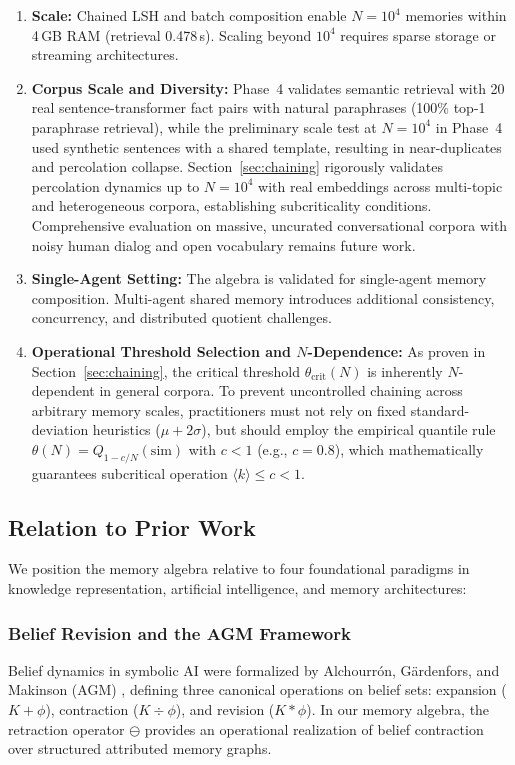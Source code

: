 \documentclass[11pt,a4paper]{article}
\theoremstyle{definition}
\begin{document}
\begin{enumerate}
    \item \textbf{Scale:} Chained LSH and batch composition enable $N = 10^4$ memories within 4\,GB RAM (retrieval 0.478\,s). Scaling beyond $10^4$ requires sparse storage or streaming architectures.
    \item \textbf{Corpus Scale and Diversity:} Phase~4 validates semantic retrieval with 20 real sentence-transformer fact pairs with natural paraphrases (100\% top-1 paraphrase retrieval), while the preliminary scale test at $N = 10^4$ in Phase~4 used synthetic sentences with a shared template, resulting in near-duplicates and percolation collapse. Section~\ref{sec:chaining} rigorously validates percolation dynamics up to $N = 10^4$ with real embeddings across multi-topic and heterogeneous corpora, establishing subcriticality conditions. Comprehensive evaluation on massive, uncurated conversational corpora with noisy human dialog and open vocabulary remains future work.
    \item \textbf{Single-Agent Setting:} The algebra is validated for single-agent memory composition. Multi-agent shared memory introduces additional consistency, concurrency, and distributed quotient challenges.
    \item \textbf{Operational Threshold Selection and $N$-Dependence:} As proven in Section~\ref{sec:chaining}, the critical threshold $\theta_{\mathrm{crit}}(N)$ is inherently $N$-dependent in general corpora. To prevent uncontrolled chaining across arbitrary memory scales, practitioners must not rely on fixed standard-deviation heuristics ($\mu + 2\sigma$), but should employ the empirical quantile rule $\theta(N) = Q_{1 - c/N}(\mathrm{sim})$ with $c < 1$ (e.g., $c = 0.8$), which mathematically guarantees subcritical operation $\langle k \rangle \le c < 1$.
\end{enumerate}

\subsection{Relation to Prior Work}\label{sec:related_work}

We position the memory algebra relative to four foundational paradigms in knowledge representation, artificial intelligence, and memory architectures:

\subsubsection{Belief Revision and the AGM Framework}
Belief dynamics in symbolic AI were formalized by Alchourr{\'o}n, G{\"a}rdenfors, and Makinson (AGM) \cite{alchourron1985logic}, defining three canonical operations on belief sets: expansion ($K + \phi$), contraction ($K \div \phi$), and revision ($K * \phi$). In our memory algebra, the retraction operator $\ominus$ provides an operational realization of belief contraction over structured attributed memory graphs.
\end{document}
